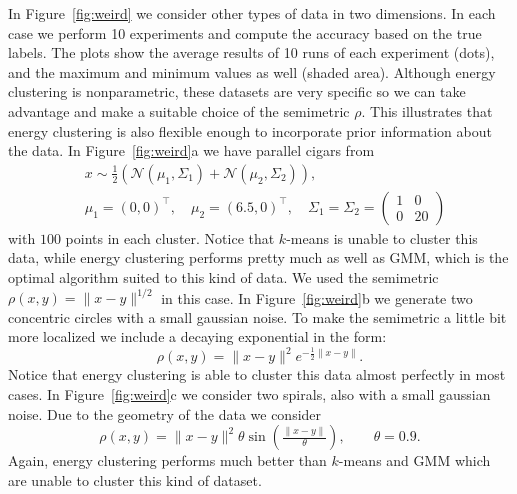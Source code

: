 \documentclass[aps,preprint,nofootinbib,floatfix]{revtex4-1}
\begin{document}
In Figure~\ref{fig:weird} we consider other types of data in two dimensions.
In each case we perform 10 experiments and compute the accuracy
based on the true labels. The plots show the average results of 10 runs
of each experiment (dots), and the maximum and minimum values as well (shaded
area). Although energy clustering is nonparametric, these datasets are
very specific so we can take advantage and make a suitable choice of
the semimetric $\rho$. This illustrates that energy clustering is also
flexible enough to incorporate prior information about the data.
In Figure~\ref{fig:weird}a we have parallel cigars from
\begin{equation}
\label{eq:cigar}
\begin{split}
&x \sim \tfrac{1}{2}\left( 
\mathcal{N}(\mu_1, \Sigma_1) + 
\mathcal{N}(\mu_2, \Sigma_2)
\right), \\
& \mu_1 = (0,0)^\top, \quad \mu_2 = (6.5, 0)^\top, \quad
\Sigma_1 = \Sigma_2 = \left( \begin{smallmatrix} 
1 & 0 \\ 0 & 20
\end{smallmatrix}\right)
\end{split}
\end{equation}
with $100$ points in each cluster. Notice that $k$-means is unable to
cluster this data, while energy clustering performs pretty much as well
as GMM, which is the optimal algorithm suited to this kind of data.
We used the semimetric $\rho(x,y) = \| x -  y\|^{1/2}$ in this case.
In Figure~\ref{fig:weird}b we generate two concentric circles with a small
gaussian noise. To make the semimetric a little bit more localized we
include a decaying exponential in the form:
\begin{equation}
\label{eq:rho_loc}
\rho(x,y) = \| x-y \|^2 e^{-\tfrac{1}{2}\| x-y \|}.
\end{equation}
Notice that energy clustering is able to cluster this data almost perfectly
in most cases.
In Figure~\ref{fig:weird}c we consider two spirals, also with a small
gaussian noise. Due to the geometry of the data
we consider
\begin{equation}
\label{eq:rho_sin}
\rho(x,y) = \| x - y\|^2 \theta \sin \left(  \tfrac{\| x-y \|}{\theta}\right),
\qquad \theta = 0.9.
\end{equation}
Again, energy clustering performs much better than $k$-means and GMM which
are unable to cluster this kind of dataset.
\end{document}
